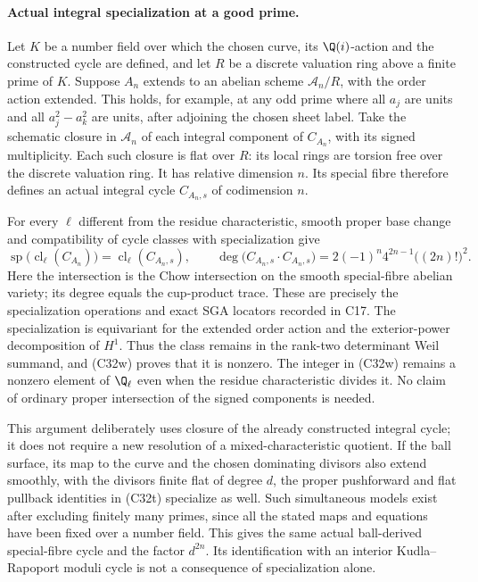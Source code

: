 \paragraph{Actual integral specialization at a good prime.}
Let $K$ be a number field over which the chosen curve, its
$\Q(i)$-action and the constructed cycle are defined, and
let $R$ be a discrete valuation ring above a finite prime
of $K$. Suppose $A_n$ extends to an abelian scheme
$\mathcal A_n/R$, with the order action extended. This
holds, for example, at any odd prime where all $a_j$ are
units and all $a_j^2-a_k^2$ are units, after adjoining the
chosen sheet label. Take the schematic closure in
$\mathcal A_n$ of each integral component of $C_{A_n}$,
with its signed multiplicity. Each such closure is flat
over $R$: its local rings are torsion free over the
discrete valuation ring. It has relative dimension $n$.
Its special fibre therefore defines an actual integral
cycle $C_{A_n,s}$ of codimension $n$.

For every $\ell$ different from the residue characteristic,
smooth proper base change and compatibility of cycle
classes with specialization give
\[
 \operatorname{sp}\bigl(\operatorname{cl}_{\ell}(C_{A_n})\bigr)
       =\operatorname{cl}_{\ell}(C_{A_n,s}),\qquad
 \deg\bigl(C_{A_n,s}\cdot C_{A_n,s}\bigr)
       =2(-1)^n4^{2n-1}\bigl((2n)!\bigr)^2.
                                                        \tag{C32w}
\]
Here the intersection is the Chow intersection on the
smooth special-fibre abelian variety; its degree equals
the cup-product trace. These are precisely the
specialization operations and exact SGA locators recorded
in C17. The specialization is equivariant for the extended
order action and the exterior-power decomposition of
$H^1$. Thus the class remains in the rank-two determinant
Weil summand, and (C32w) proves that it is nonzero. The
integer in (C32w) remains a nonzero element of $\Q_\ell$
even when the residue characteristic divides it. No
claim of ordinary proper intersection of the signed
components is needed.

This argument deliberately uses closure of the already
constructed integral cycle; it does not require a new
resolution of a mixed-characteristic quotient. If the
ball surface, its map to the curve and the chosen
dominating divisors also extend smoothly, with the
divisors finite flat of degree $d$, the proper pushforward
and flat pullback identities in (C32t) specialize as
well. Such simultaneous models exist after excluding
finitely many primes, since all the stated maps and
equations have been fixed over a number field. This
gives the same actual ball-derived special-fibre cycle
and the factor $d^{2n}$. Its identification with an
interior Kudla--Rapoport moduli cycle is not a consequence
of specialization alone.

